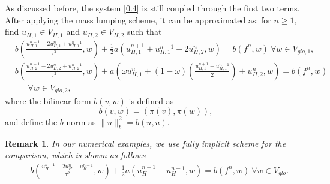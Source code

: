 \documentclass[preprint,12pt]{elsarticle}
\newtheorem{remark}{Remark}
\begin{document}
As discussed before, the system \eqref{0.4} is still coupled through the first two terms. After applying the mass lumping scheme, it can be approximated as: for $n\geq1$, find $u_{H,1}\in V_{H,1}$ and $u_{H,2}\in V_{H,2}$ such that
\begin{equation}\label{pis}
\begin{aligned}
     &b\left(\frac{u_{H,1}^{n+1}-2u_{H,1}^{n}+u_{H,1}^{n-1}}{\tau^2},w\right)+\frac{1}{2}a\left(u_{H,1}^{n+1}+u_{H,1}^{n-1}+2u_{H,2}^{n},w\right)=b\left(f^n,w\right)~ \forall w \in V_{glo,1},\\
     &b\left(\frac{u_{H,2}^{n+1}-2u_{H,2}^{n}+u_{H,2}^{n-1}}{\tau^2},w\right)+a\left(\omega u_{H,1}^{n}+(1-\omega)\left(\frac{u_{H,1}^{n+1}+u_{H,1}^{n-1}}{2}\right)+u_{H,2}^{n},w\right)=b\left(f^n,w\right)~\\&~~~~~~~\forall w \in V_{glo,2},
\end{aligned}
\end{equation}
where the bilinear form $b(v,w)$ is defined as
$$b(v,w)=(\pi(v),\pi(w)),$$ and define the $b$ norm as $\|u\|^2_b=b(u,u).$
\begin{remark}
    In our numerical examples, we use fully implicit scheme for the comparison, which is shown as follows
\begin{equation}\label{fully implicit}
\begin{aligned}
     &b\left(\frac{u_{H}^{n+1}-2u_{H}^{n}+u_{H}^{n-1}}{\tau^2},w\right)+\frac{1}{2}a\left(u_{H}^{n+1}+u_{H}^{n-1},w\right)=b\left(f^n,w\right)~ \forall w \in V_{glo}.
\end{aligned}
\end{equation}
    
\end{remark}
\end{document}
